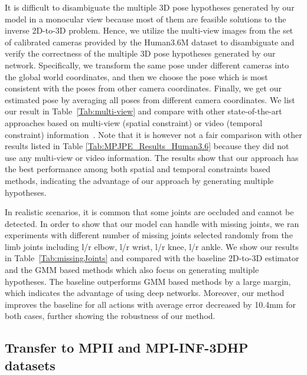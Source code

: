 \documentclass[10pt,twocolumn,letterpaper]{article}
\begin{document}
It is difficult to disambiguate the multiple 3D pose hypotheses generated by our model in a monocular view because most of them are feasible solutions to the inverse 2D-to-3D problem. Hence, we utilize the multi-view images from the set of calibrated cameras provided by the Human3.6M dataset to disambiguate and verify the correctness of the multiple 3D pose hypotheses generated by our network.
Specifically, we transform the same pose under different cameras into the global world coordinates, and then we choose the pose which is most consistent with the poses from other camera coordinates. Finally, we get our estimated pose by averaging all poses from different camera coordinates. We list our result in Table~\ref{Tab:multi-view} and compare with other state-of-the-art approaches based on multi-view \cite{pavlakos2017harvesting} (spatial constraint) or video (temporal constraint) information~\cite{lee2018propagating,hossain2018exploiting}.
Note that it is however not a fair comparison with other results listed in Table \ref{Tab:MPJPE_Results_Human3.6} because they did not use any multi-view or video information. The results show that our approach has the best performance among both spatial and temporal constraints based methods, indicating the advantage of our approach by generating multiple hypotheses. 

In realistic scenarios, it is common that some joints are occluded and cannot be detected. In order to show that our model can handle with missing joints, we ran experiments with different number of missing joints selected randomly from the limb joints including l/r elbow, l/r wrist, l/r knee, l/r ankle. We show our results in Table~\ref{Tab:missingJoints} and compared with the baseline 2D-to-3D estimator \cite{martinez2017simple} and the GMM based methods \cite{jahangiri2017generating} which also focus on generating multiple hypotheses. The baseline outperforms GMM based methods by a large margin, which indicates the advantage of using deep networks. Moreover, our method improves the baseline for all actions with average error decreased by 10.4mm for both cases, further showing the robustness of our method.

\subsection{Transfer to MPII and MPI-INF-3DHP datasets }
\end{document}
